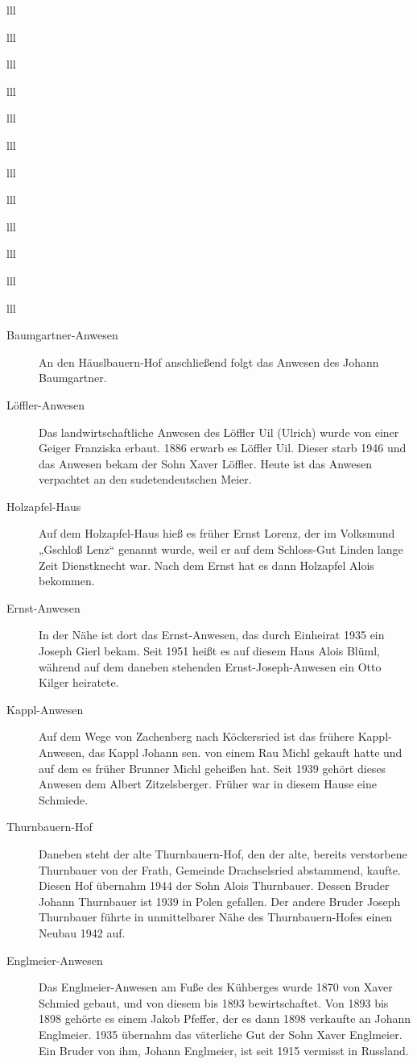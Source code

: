 \documentclass[12pt,a4pager]{book}
\begin{document}
\begin{tabuluar}{lll}
\begin{tabuluar}{lll}
\begin{tabuluar}{lll}
\begin{tabuluar}{lll}
\begin{tabuluar}{lll}
\begin{tabuluar}{lll}
\begin{tabuluar}{lll}
\begin{tabuluar}{lll}
\begin{tabuluar}{lll}
\begin{tabuluar}{lll}
\begin{tabuluar}{lll}
\begin{tabuluar}{lll}
\begin{description}
\item[Baumgartner-Anwesen] An den Häuslbauern-Hof anschließend folgt das Anwesen
des Johann Baumgartner.

\item[Löffler-Anwesen] Das landwirtschaftliche Anwesen des Löffler Uil (Ulrich)
wurde von einer Geiger Franziska erbaut. 1886 erwarb es Löffler Uil. Dieser
starb 1946 und das Anwesen bekam der Sohn Xaver Löffler. Heute ist das Anwesen
verpachtet an den sudetendeutschen Meier.

\item[Holzapfel-Haus] Auf dem Holzapfel-Haus hieß es früher Ernst Lorenz, der im
Volksmund „Gschloß Lenz“ genannt wurde, weil er auf dem Schloss-Gut Linden lange
Zeit Dienstknecht war. Nach dem Ernst hat es dann Holzapfel Alois bekommen.

\item[Ernst-Anwesen] In der Nähe ist dort das Ernst-Anwesen, das durch Einheirat
1935 ein Joseph Gierl bekam. Seit 1951 heißt es auf diesem Haus Alois Blüml,
während auf dem daneben stehenden Ernst-Joseph-Anwesen ein Otto Kilger
heiratete.

\item[Kappl-Anwesen] Auf dem Wege von Zachenberg nach Köckersried ist das
frühere Kappl-Anwesen, das Kappl Johann sen. von einem Rau Michl gekauft hatte
und auf dem es früher Brunner Michl geheißen hat. Seit 1939 gehört dieses
Anwesen dem Albert Zitzelsberger. Früher war in diesem Hause eine Schmiede.

\item[Thurnbauern-Hof] Daneben steht der alte Thurnbauern-Hof, den der alte,
bereits verstorbene Thurnbauer von der Frath, Gemeinde Drachselsried abstammend,
kaufte. Diesen Hof übernahm 1944 der Sohn Alois Thurnbauer. Dessen Bruder Johann
Thurnbauer ist 1939 in Polen gefallen. Der andere Bruder Joseph Thurnbauer
führte in unmittelbarer Nähe des Thurnbauern-Hofes einen Neubau 1942 auf.

\item[Englmeier-Anwesen] Das Englmeier-Anwesen am Fuße des Kühberges wurde 1870
von Xaver Schmied gebaut, und von diesem bis 1893 bewirtschaftet. Von 1893 bis
1898 gehörte es einem Jakob Pfeffer, der es dann 1898 verkaufte an Johann
Englmeier. 1935 übernahm das väterliche Gut der Sohn Xaver Englmeier. Ein Bruder
von ihm, Johann Englmeier, ist seit 1915 vermisst in Russland.


\end{description}
\end{tabuluar}
\end{tabuluar}
\end{tabuluar}
\end{tabuluar}
\end{tabuluar}
\end{tabuluar}
\end{tabuluar}
\end{tabuluar}
\end{tabuluar}
\end{tabuluar}
\end{tabuluar}
\end{tabuluar}
\end{document}
